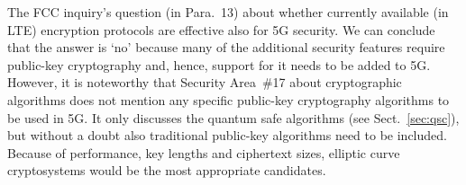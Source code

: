 \documentclass[lnicst,sechang,a4paper]{svmultln}
\begin{document}










The FCC inquiry's question (in Para.~13) about whether currently available (in LTE) encryption protocols are effective also for 5G security. We can conclude that the answer  is `no' because many of the additional security features require public-key cryptography and, hence, support for it needs to be added to 5G. However, it is noteworthy that Security Area~\#17 about cryptographic algorithms does not mention any specific public-key cryptography algorithms to be used in 5G. It only discusses the quantum safe algorithms (see Sect.~\ref{sec:qsc}), but without a doubt also traditional public-key algorithms need to be included. Because of performance, key lengths and ciphertext sizes, elliptic curve cryptosystems would be the most appropriate candidates.
\end{document}
